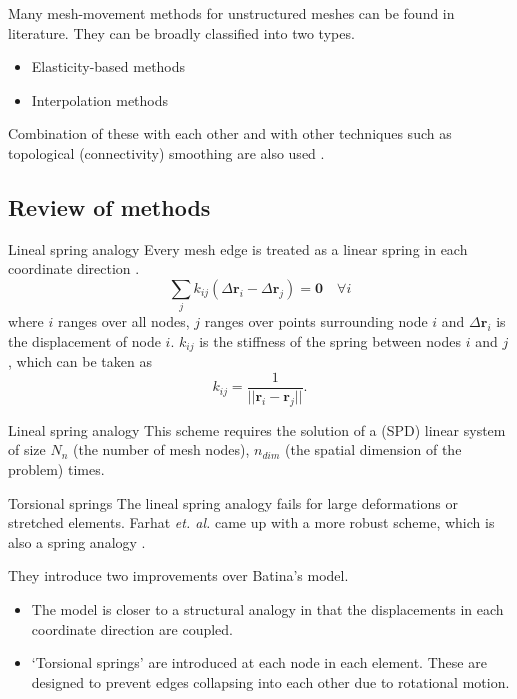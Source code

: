 \documentclass[t,12pt]{beamer}
\begin{document}
\begin{frame}
Many mesh-movement methods for unstructured meshes can be found in literature. They can be broadly classified into two types.
\vspace{0.2in}
\begin{itemize}
	\item Elasticity-based methods
	\item Interpolation methods
\end{itemize}
\vspace{0.2in}
Combination of these with each other and with other techniques such as topological (connectivity) smoothing are also used .
\end{frame}

\subsection{Review of methods}

\begin{frame}{Lineal spring analogy}
	Every mesh edge is treated as a linear spring in each coordinate direction .
	 \begin{equation}
	 \sum_j k_{ij}(\Delta \mathbf{r}_i - \Delta \mathbf{r}_j) = \mathbf{0} \quad \forall i
	 \label{spring}
	 \end{equation}
	 where $i$ ranges over all nodes, $j$ ranges over points surrounding node $i$ and $\Delta \mathbf{r}_i$ is the displacement of node $i$.
	 $k_{ij}$ is the stiffness of the spring between nodes $i$ and $j$, which can be taken as
	 \begin{equation}
	 k_{ij} = \frac{1}{||\mathbf{r}_i - \mathbf{r}_j||}.
	 \end{equation}
\end{frame}
\begin{frame}{Lineal spring analogy}
	This scheme requires the solution of a (SPD) linear system of size $N_n$ (the number of mesh nodes), $n_{dim}$ (the spatial dimension of the problem) times.
\end{frame}

\begin{frame}{Torsional springs}
The lineal spring analogy fails for large deformations or stretched elements. Farhat \emph{et. al.} came up with a more robust scheme, which is also a spring analogy .

They introduce two improvements over Batina's model.
\begin{itemize}
	\item The model is closer to a structural analogy in that the displacements in each coordinate direction are coupled.
	\item `Torsional springs' are introduced at each node in each element. These are designed to prevent edges collapsing into each other due to rotational motion.
\end{itemize}
\end{frame}
\end{document}

